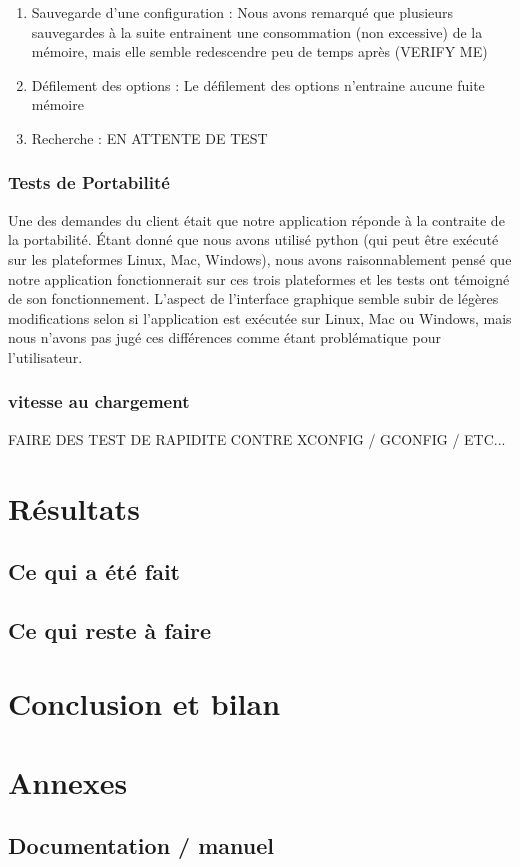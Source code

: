 \documentclass[16pts]{report}
\begin{document}
\begin{enumerate}
	\item Sauvegarde d'une configuration : Nous avons remarqué que 
          plusieurs sauvegardes à la suite entrainent une consommation 
          (non excessive) de la mémoire, mais elle semble redescendre
          peu de temps après (VERIFY ME)

	\item Défilement des options : Le défilement des options n'entraine
          aucune fuite mémoire

	\item Recherche : EN ATTENTE DE TEST 
\end{enumerate}


\subsection{Tests de Portabilité}

Une des demandes du client était que notre application réponde à la contraite
de la portabilité. Étant donné que nous avons utilisé python (qui peut être 
exécuté sur les plateformes Linux, Mac, Windows), nous avons raisonnablement
pensé que notre application fonctionnerait sur ces trois plateformes et les tests
ont témoigné de son fonctionnement. L'aspect de l'interface graphique semble
subir de légères modifications selon si l'application est exécutée sur Linux,
Mac ou Windows, mais nous n'avons pas jugé ces différences comme étant
problématique pour l'utilisateur.

\subsection{vitesse au chargement}

FAIRE DES TEST DE RAPIDITE CONTRE XCONFIG / GCONFIG / ETC...


\chapter{Résultats}
\label{cha:Résultats}
    \section{Ce qui a été fait}
    \label{sec:Ce qui a été fait}

    \section{Ce qui reste à faire}
    \label{sec:Ce qui reste à faire}

\chapter{Conclusion et bilan}
\label{cha:Conclusion et bilan}

\chapter{Annexes}
\label{cha:Annexes}
    \section{Documentation / manuel}
    \label{sec:Documentation / manuel}


\end{document}
